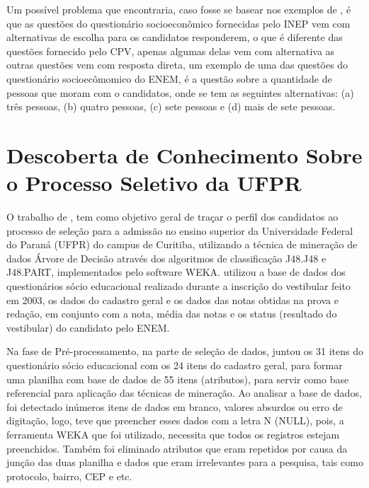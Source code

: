 \par
Um possível problema que encontraria, caso fosse se basear nos exemplos de , é que as questões do questionário socioeconômico fornecidas pelo INEP vem com alternativas de escolha para os candidatos responderem, o que é diferente das questões fornecido pelo CPV, apenas algumas delas vem com alternativa as outras questões vem com resposta direta, um exemplo de uma das questões do questionário socioecômomico do ENEM, é a questão sobre a quantidade de pessoas que moram com o candidatos, onde se tem as seguintes alternativas: (a) três pessoas, (b) quatro pessoas, (c) sete pessoas e (d) mais de sete pessoas.

\section{Descoberta de Conhecimento Sobre o Processo Seletivo da UFPR}

\par
O trabalho de , tem como objetivo geral de traçar o perfil dos candidatos ao processo de seleção para a admissão no ensino superior da Universidade Federal do Paraná (UFPR) do campus de Curitiba, utilizando a técnica de mineração de dados Árvore de Decisão através dos algoritmos de classificação J48.J48 e J48.PART, implementados pelo software WEKA.  utilizou a base de dados dos questionários sócio educacional realizado durante a inscrição do vestibular feito em 2003, os dados do cadastro geral e os dados das notas obtidas na prova e redação, em conjunto com a nota, média das notas e os status (resultado do vestibular) do candidato pelo ENEM. 

\par
Na fase de Pré-processamento, na parte de seleção de dados,  juntou os 31 itens do questionário sócio educacional com os 24 itens do cadastro geral, para formar uma planilha com base de dados de 55 itens (atributos), para servir como base referencial para aplicação das técnicas de mineração. Ao analisar a base de dados, foi detectado inúmeros itens de dados em branco, valores absurdos ou erro de digitação, logo,  teve que preencher esses dados com a letra N (NULL), pois, a ferramenta WEKA que foi utilizado, necessita que todos os registros estejam preenchidos. Também foi eliminado atributos que eram repetidos por causa da junção das duas planilha e dados que eram irrelevantes para a pesquisa, tais como protocolo, bairro, CEP e etc.

